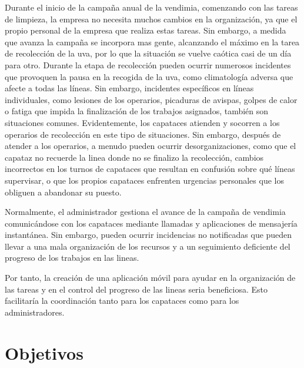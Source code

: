 Durante el inicio de la campaña anual de la vendimia, comenzando con las tareas de limpieza, la empresa no necesita muchos cambios en la organización, ya que el propio personal de la empresa 
que realiza estas tareas. Sin embargo, a medida que avanza la campaña se incorpora mas gente, alcanzando el máximo en la tarea de recolección de la uva, 
por lo que la situación se vuelve caótica casi de un día para otro.
Durante la etapa de recolección pueden ocurrir numerosos incidentes que provoquen la pausa en la recogida de la uva, como climatología adversa que afecte a todas las líneas. 
Sin embargo, incidentes específicos en líneas individuales, como lesiones de los operarios, picaduras de avispas, golpes de calor o fatiga que impida la finalización de los trabajos asignados, también son situaciones comunes.
Evidentemente, los capataces atienden y socorren a los operarios de recolección en este tipo de situaciones. Sin embargo, después de atender a los operarios, 
a menudo pueden ocurrir desorganizaciones, como que el capataz  no recuerde la linea donde no se finalizo la recolección, cambios incorrectos en los turnos de capataces 
que resultan en confusión sobre qué líneas supervisar, o que los propios capataces enfrenten urgencias personales que los obliguen a abandonar su puesto.

Normalmente, el administrador gestiona el avance de la campaña de vendimia comunicándose con los capataces mediante llamadas y aplicaciones de mensajería instantánea.
Sin embargo, pueden ocurrir incidencias no notificadas que pueden llevar a una mala organización de los recursos y a un seguimiento deficiente del progreso de los trabajos en las lineas.

Por tanto, la creación de una aplicación móvil para ayudar en la organización de las tareas y en el control del progreso de las lineas seria beneficiosa. Esto facilitaría la coordinación tanto para los capataces como para los administradores.


\section{Objetivos}

